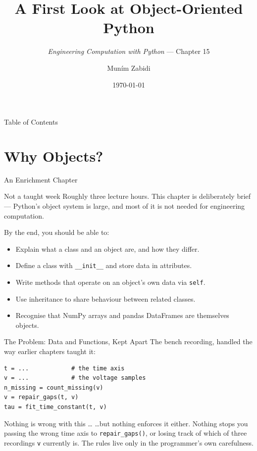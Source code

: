 \documentclass[9pt,aspectratio=169,xcolor=table]{beamer}
\title{A First Look at Object-Oriented Python}
\subtitle{\emph{Engineering Computation with Python} --- Chapter 15}
\author{Mun\'{i}m Zabidi}
\institute{\color{primary}Faculty of Electrical Engineering, Universiti Teknologi Malaysia}
\date{\today}
\begin{document}
\titlepage

\begin{frame}{Table of Contents}
    \tableofcontents
\end{frame}

\section{Why Objects?}

\begin{frame}{An Enrichment Chapter}
    \leavevmode
    \small
    \begin{alertblock}{Not a taught week}
        Roughly three lecture hours. This chapter is deliberately brief ---
        Python's object system is large, and most of it is not needed for
        engineering computation.
    \end{alertblock}

    \vspace{3mm}
    By the end, you should be able to:
    \begin{itemize}\itemsep1pt
        \item Explain what a class and an object are, and how they differ.
        \item Define a class with \texttt{\_\_init\_\_} and store data in
              attributes.
        \item Write methods that operate on an object's own data via
              \texttt{self}.
        \item Use inheritance to share behaviour between related classes.
        \item Recognise that NumPy arrays and pandas DataFrames are
              themselves objects.
    \end{itemize}
\end{frame}

\begin{frame}[fragile]{The Problem: Data and Functions, Kept Apart}
    \leavevmode
    The bench recording, handled the way earlier chapters taught it:

\begin{lstlisting}
t = ...            # the time axis
v = ...            # the voltage samples
n_missing = count_missing(v)
v = repair_gaps(t, v)
tau = fit_time_constant(t, v)
\end{lstlisting}

    \vspace{1mm}
    \begin{block}{Nothing is wrong with this \ldots}
        \ldots but nothing \alert{enforces} it either. Nothing stops you
        passing the wrong time axis to \texttt{repair\_gaps()}, or losing
        track of which of three recordings \texttt{v} currently is. The
        rules live only in the programmer's own carefulness.
    \end{block}
\end{frame}
\end{document}
